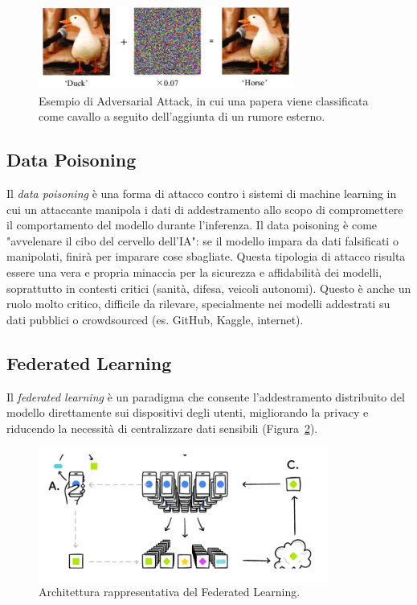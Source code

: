 \begin{figure}
    \centering
    \includegraphics[width=0.75\textwidth]{figure/AdversarialAttack.png}
    \caption{Esempio di Adversarial Attack, in cui una papera viene classificata come cavallo a seguito dell'aggiunta di un rumore esterno.}
    \label{fig:adattack}
\end{figure}

\subsection{Data Poisoning}
Il \textit{data poisoning} è una forma di attacco contro i sistemi di machine learning in cui un attaccante manipola i dati di addestramento allo scopo di compromettere il comportamento del modello durante l’inferenza. Il data poisoning è come "avvelenare il cibo del cervello dell’IA": se il modello impara da dati falsificati o manipolati, finirà per imparare cose sbagliate. Questa tipologia di attacco risulta essere una vera e propria minaccia per la sicurezza e affidabilità dei modelli, soprattutto in contesti critici (sanità, difesa, veicoli autonomi). Questo è anche un ruolo molto critico, difficile da rilevare, specialmente nei modelli addestrati su dati pubblici o crowdsourced (es. GitHub, Kaggle, internet).


\subsection{Federated Learning}

Il \emph{federated learning} è un paradigma che consente l’addestramento distribuito del modello direttamente sui dispositivi degli utenti, migliorando la privacy e riducendo la necessità di centralizzare dati sensibili (Figura~\ref{fig:FedLearning}).

\begin{figure}
    \centering
    \includegraphics[width=0.85\textwidth]{figure/FederatedLearning.png}
    \caption{Architettura rappresentativa del Federated Learning.}
    \label{fig:FedLearning}
\end{figure}

